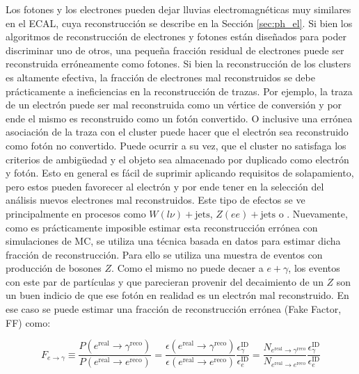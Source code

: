 Los fotones y los electrones pueden dejar lluvias electromagnéticas muy
similares en el ECAL, cuya reconstrucción se describe en la Sección \ref{sec:ph_el}.
Si bien los algoritmos de reconstrucción de electrones y fotones están diseñados para poder discriminar uno de otros, una pequeña fracción residual de electrones puede ser reconstruida erróneamente como fotones. Si bien la reconstrucción de los clusters es altamente efectiva, la fracción de electrones mal reconstruidos se debe prácticamente a ineficiencias en la reconstrucción de trazas. Por ejemplo, la traza de un electrón puede ser mal reconstruida como un vértice de conversión y por ende el mismo es reconstruido como un fotón convertido. O inclusive una errónea asociación de la traza con el cluster puede hacer que el electrón sea reconstruido como fotón no convertido.
Puede ocurrir a su vez, que el cluster no satisfaga los criterios de ambigüedad y el objeto sea almacenado por duplicado como electrón y fotón. Esto en general es fácil de suprimir aplicando requisitos de solapamiento, pero estos pueden favorecer al electrón y por ende tener en la selección del análisis nuevos electrones mal reconstruidos. Este tipo de efectos se ve principalmente en procesos como $W(l\nu)+\text{jets}$, $Z(ee)+\text{jets}$ o \ttbar. Nuevamente, como es prácticamente imposible estimar esta reconstrucción errónea con simulaciones de MC, se utiliza una técnica basada en datos para estimar dicha fracción de reconstrucción. Para ello se utiliza una muestra de eventos con producción de bosones $Z$. Como el mismo no puede decaer a $e+\gamma$, los eventos con este par de partículas y que parecieran provenir del decaimiento de un $Z$ son un buen indicio de que ese fotón en realidad es un electrón mal reconstruido. En ese caso se puede estimar una fracción de reconstrucción errónea (Fake Factor, FF) como:

\begin{equation}
  F_{e\to \gamma} \equiv \frac{P(e^{\text{real}}\to \gamma^{\text{reco}})}{P(e^{\text{real}}\to e^{\text{reco}})}  = \frac{\epsilon(e^{\text{real}}\to \gamma^{\text{reco}})}{\epsilon(e^{\text{real}}\to e^{\text{reco}})} \frac{\epsilon^{\text{ID}}_{\gamma}}{\epsilon^{\text{ID}}_{e}} = \frac{N_{e^{\text{real}}\to \gamma^{\text{reco}}}}{N_{e^{\text{real}}\to e^{\text{reco}}}} \frac{\epsilon^{\text{ID}}_{\gamma}}{\epsilon^{\text{ID}}_{e}}
  \label{eq:efake_ff}
\end{equation} 

